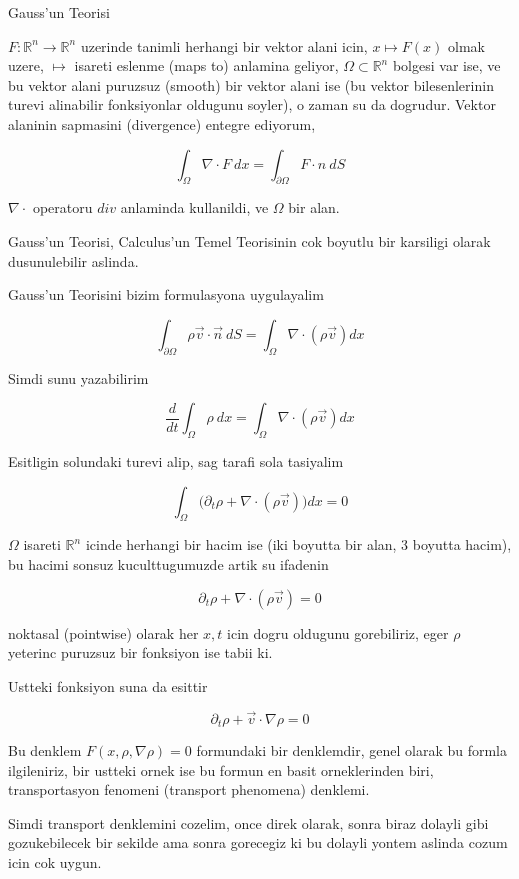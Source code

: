 \documentclass[12pt,fleqn]{article}\usepackage{../common}
\begin{document}
Gauss'un Teorisi

$F: \mathbb{R}^n \to \mathbb{R}^n$ uzerinde tanimli herhangi bir vektor alani icin,
$x
\mapsto F(x)$ olmak uzere, $\mapsto$ isareti eslenme (maps to) anlamina
geliyor, $\Omega \subset \mathbb{R}^n$ bolgesi var ise, ve bu vektor alani
puruzsuz (smooth) bir vektor alani ise (bu vektor bilesenlerinin
turevi alinabilir fonksiyonlar oldugunu soyler), o zaman su da
dogrudur. Vektor alaninin sapmasini (divergence) entegre ediyorum, 

\[ 
\int_\Omega \nabla \cdot F \ dx =
\int_{\partial \Omega} F \cdot n \ dS
\]


$\nabla \cdot$ operatoru $div$ anlaminda kullanildi, ve $\Omega$ bir alan. 

Gauss'un Teorisi, Calculus'un Temel Teorisinin cok boyutlu bir karsiligi
olarak dusunulebilir aslinda.

Gauss'un Teorisini bizim formulasyona uygulayalim

\[ \int_{\partial \Omega} \rho \vec{v} \cdot \vec{n} \ dS =
\int_\Omega \nabla \cdot (\rho \vec{v}) dx 
\]

Simdi sunu yazabilirim

\[ \frac{d}{dt} \int_\Omega \rho \ dx = 
\int_\Omega \nabla \cdot (\rho \vec{v}) dx
 \]

Esitligin solundaki turevi alip, sag tarafi sola tasiyalim

\[ \int_\Omega \bigg( 
\partial_t \rho + \nabla \cdot (\rho \vec{v}) 
\bigg)dx = 0
 \]

$\Omega$ isareti $\mathbb{R}^n$ icinde herhangi bir hacim ise (iki boyutta bir
alan, 3 boyutta hacim), bu hacimi sonsuz kuculttugumuzde artik su ifadenin 

\[ \partial_t \rho + \nabla \cdot (\rho \vec{v})  = 0 \]

noktasal (pointwise) olarak her $x,t$ icin dogru oldugunu gorebiliriz, eger
$\rho$ yeterinc puruzsuz bir fonksiyon ise tabii ki. 

Ustteki fonksiyon suna da esittir

\[ \partial_t \rho + \vec{v} \cdot \nabla \rho = 0\]

Bu denklem $F(x,\rho,\nabla \rho)=0$ formundaki bir denklemdir, genel
olarak bu formla ilgileniriz, bir ustteki ornek ise bu formun en basit
orneklerinden biri, transportasyon fenomeni (transport phenomena) denklemi.

Simdi transport denklemini cozelim, once direk olarak, sonra biraz dolayli
gibi gozukebilecek bir sekilde ama sonra gorecegiz ki bu dolayli yontem
aslinda cozum icin cok uygun. 
\end{document}
